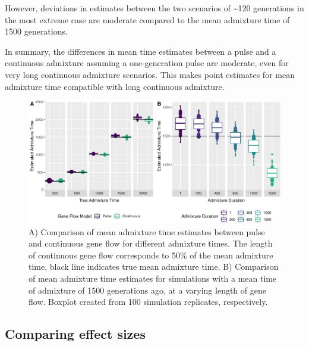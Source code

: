 \documentclass[]{article}
\begin{document}
However, deviations in
estimates between the two scenarios of \textasciitilde{}120 generations
in the most extreme case are moderate compared to the mean admixture
time of 1500 generations.

In summary, the differences in mean time estimates between a pulse and a continuous admixture assuming a one-generation pulse are moderate, even for very long continuous admixture scenarios. This makes point estimates for mean admixture time compatible with long continuous admixture.


\begin{figure}
\centering
\includegraphics{Admixture_Time_Inference_Paper_Draft_files/figure-latex/fig2-1.pdf}
\caption{\label{fig:fig2} A) Comparison of mean admixture time estimates
between pulse and continuous gene flow for different admixture times.
The length of continuous gene flow corresponds to 50\% of the mean
admixture time, black line indicates true mean admixture time. B)
Comparison of mean admixture time estimates for simulations with a mean
time of admixture of 1500 generations ago, at a varying length of gene
flow. Boxplot created from 100 simulation replicates, respectively.}
\end{figure}
\subsection{Comparing effect sizes}\label{comparing effect sizes}
\end{document}
